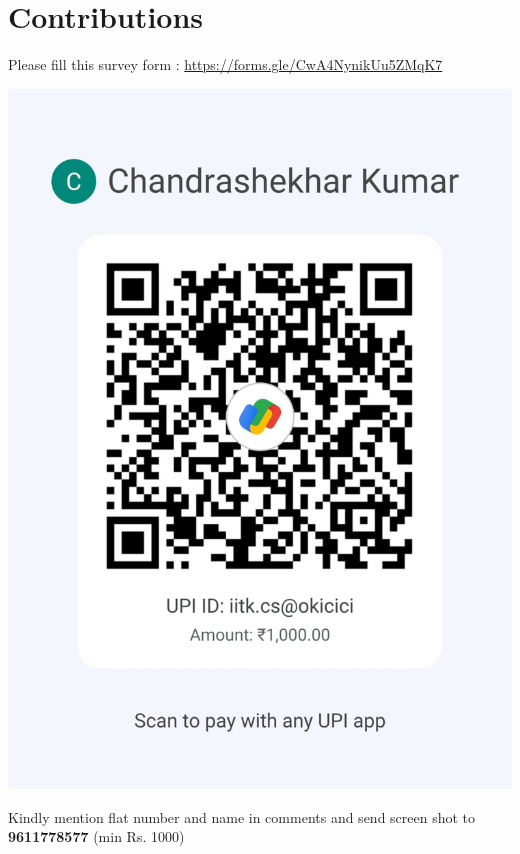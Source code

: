\documentclass[makeidx, 11pt, oneside, onecolumn, openright, final, svgnames, dvipsnames, extrafontsizes]{memoir}
\begin{document}
\renewcommand{\contentsname}{Fun Events}

\tableofcontents*


\chapter*{Contributions}

Please fill this survey form :
\url{https://forms.gle/CwA4NynikUu5ZMqK7}



\begin{center}
\includegraphics[scale=1]{qr.jpeg}
\end{center}

 Kindly mention flat number and name in comments and send screen shot to \textbf{\color{Fuchsia}9611778577} (min Rs. 1000)
 
 

\mainmatter
\pagestyle{companion}
\setlength{\headwidth}{\textwidth}
\setlength{\headwidth}{\textwidth}
\end{document}

